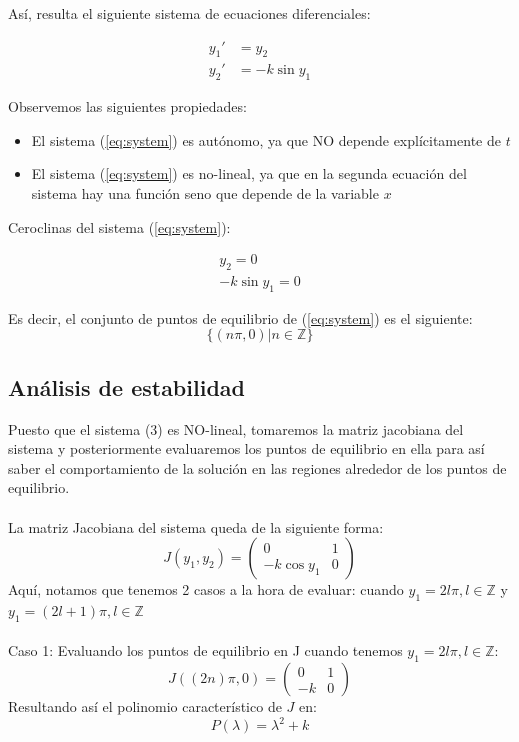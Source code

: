 \documentclass[10pt,letterpaper,titlepage]{article}
\begin{document}
As\'i, resulta el siguiente sistema de ecuaciones diferenciales:

\begin{equation}\label{eq:system}
	\begin{split}
		y_{1}' & = y_{2}\\
		y_{2}' & = -k\sin y_{1}
	\end{split}
\end{equation}

Observemos las siguientes propiedades:
\begin{itemize}
	\item El sistema (\ref{eq:system}) es aut\'onomo, ya que NO depende expl\'icitamente de $t$
	\item El sistema (\ref{eq:system}) es no-lineal, ya que en la segunda ecuaci\'on del sistema hay una funci\'on seno que depende de la variable $x$
\end{itemize}

Ceroclinas del sistema (\ref{eq:system}):

\begin{equation}
	\begin{split}
		y_{2} = 0\\
		-k\sin y_{1} = 0
	\end{split}
\end{equation}

Es decir, el conjunto de puntos de equilibrio de (\ref{eq:system}) es el siguiente:
\begin{equation}
	\{(n \pi, 0) | n \in \mathbb{Z}\}
\end{equation}

\subsection{An\'alisis de estabilidad}
Puesto que el sistema (3) es NO-lineal, tomaremos la matriz jacobiana del sistema y posteriormente evaluaremos los puntos de equilibrio en ella para as\'i saber el comportamiento de la soluci\'on en las regiones alrededor de los puntos de equilibrio.\\\\
La matriz Jacobiana del sistema queda de la siguiente forma:
\[
	J(y_{1},y_{2}) = \begin{pmatrix}
		0 & 1\\
		-k \cos y_{1} & 0
	\end{pmatrix}
\]
Aqu\'i, notamos que tenemos 2 casos a la hora de evaluar: cuando $y_{1}= 2l\pi, l \in \mathbb{Z}$ y $y_{1}= (2l+1)\pi, l \in \mathbb{Z}$\\\\
Caso 1: Evaluando los puntos de equilibrio en J cuando tenemos $y_{1}= 2l\pi, l \in \mathbb{Z}$:
\[
	J((2n) \pi,0) = \begin{pmatrix}
		0 & 1\\
		-k & 0
	\end{pmatrix}
\]
Resultando as\'i el polinomio caracter\'istico de $J$ en:
\begin{equation}
	P(\lambda) = \lambda ^{2} + k
\end{equation}
\end{document}
